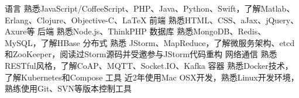 


\begin{cvskills}


\cvskill
{语言} %
{熟悉JavaScript/CoffeeScript、PHP、Java、Python、Swift，了解Matlab、Erlang、Clojure、Objective-C、LaTeX} %
\cvskill
{前端 } %
{ 熟悉HTML、CSS、aJax、jQuery、Axure等} %
\cvskill
{后端} %
{ 熟悉Node.js、ThinkPHP} %
\cvskill
{数据库} %
{熟悉MongoDB、Redis、MySQL，了解HBase} %
\cvskill
{分布式} %
{ 熟悉 JStorm、MapReduce，了解微服务架构、etcd和ZooKeeper，阅读过Storm源码并受邀参与JStorm代码重构} %
\cvskill
{网络通信} %
{  熟悉RESTful风格，了解CoAP、MQTT、Socket.IO、Kafka} %
\cvskill
{容器 } %
{  熟悉Docker技术，了解Kubernetes和Compose} %
\cvskill
{工具 } %
{  近2年使用Mac OSX开发，熟悉Linux开发环境，熟练使用Git、SVN等版本控制工具} %

\end{cvskills}